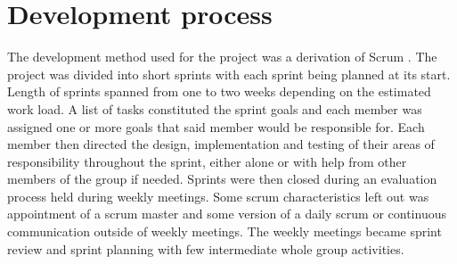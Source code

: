 \section{Development process}


The development method used for the project was a derivation of Scrum \cite{Scrum}. The project
was divided into short sprints with each sprint being planned at its start. Length of sprints 
spanned from one to two weeks depending on the estimated work load.
A list of tasks constituted the sprint goals and each member was assigned one or more goals
that said member would be responsible for. Each member then directed the design,
implementation and testing of their areas of responsibility throughout the sprint, either alone or
with help from other members of the group if needed. Sprints were then closed during an
evaluation process held during weekly meetings. Some scrum characteristics left out was appointment of a scrum master and some version of a daily scrum or continuous communication outside of weekly meetings. The weekly meetings became sprint review and sprint planning with few intermediate whole group activities.

